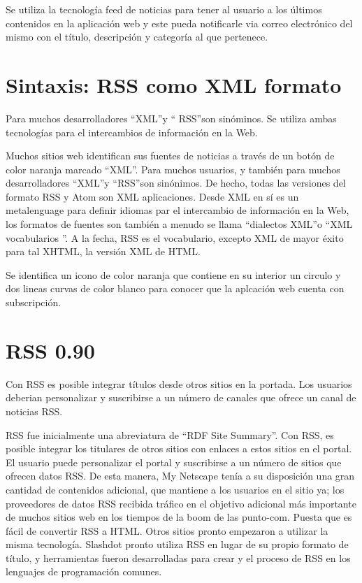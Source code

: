 Se utiliza la tecnolog\'{i}a feed de noticias para tener al usuario a los \'{u}ltimos
contenidos en la aplicaci\'{o}n web y este pueda notificarle via correo electr\'{o}nico
del mismo con el t\'{i}tulo, descripci\'{o}n y categor\'{i}a al que pertenece.

\section{Sintaxis: RSS como XML formato}

Para muchos desarrolladores \textquotedblleft XML\textquotedblright y \textquotedblleft
RSS\textquotedblright son sin\'{o}minos. Se utiliza ambas tecnolog\'{i}as para el 
intercambios de informaci\'{o}n en la Web.

Muchos sitios web identifican sus fuentes de noticias a trav\'{e}s de un bot\'{o}n
de color naranja marcado \textquotedblleft XML\textquotedblright. Para muchos usuarios,
y tambi\'{e}n para muchos desarrolladores \textquotedblleft XML\textquotedblright  y
\textquotedblleft RSS\textquotedblright son sin\'{o}nimos. De hecho, todas las versiones
del formato RSS y Atom son XML aplicaciones. Desde XML en s\'{i} es un metalenguage para
definir idiomas par el intercambio de informaci\'{o}n en la Web, los formatos de fuentes
son tambi\'{e}n a menudo se llama \textquotedblleft dialectos XML\textquotedblright  o 
\textquotedblleft XML vocabularios \textquotedblright. A la fecha, RSS es el vocabulario, 
excepto XML de mayor \'{e}xito para tal XHTML, la versi\'{o}n XML de HTML.\cite{wittenbrink2005rss}

Se identifica un icono de color naranja que contiene en su interior un circulo y dos
lineas curvas de color blanco para conocer que la aplcaci\'{o}n web cuenta con 
subscripci\'{o}n.

\section{RSS 0.90}

Con RSS es posible integrar t\'{i}tulos desde otros sitios en la portada. Los 
usuarios deberian personalizar y suscribirse a un n\'{u}mero de canales que 
ofrece un canal de noticias RSS.

RSS fue inicialmente una abreviatura de \textquotedblleft RDF Site Summary\textquotedblright.
Con RSS, es posible integrar los titulares de otros sitios con enlaces a estos sitios en el 
portal. El usuario puede personalizar el portal y suscribirse a un n\'{u}mero de sitios que
ofrecen datos RSS. De esta manera, My Netscape ten\'{i}a a su disposici\'{o}n una gran 
cantidad de contenidos adicional, que mantiene a los usuarios en el sitio ya; los proveedores
de datos RSS recibida tr\'{a}fico en el objetivo adicional m\'{a}s importante de muchos
sitios web en los tiempos de la boom de las punto-com. Puesta que es f\'{a}cil de convertir
RSS a HTML. Otros sitios pronto empezaron a utilizar la misma tecnolog\'{i}a. Slashdot pronto
utiliza RSS en lugar de su propio formato de t\'{i}tulo, y herramientas fueron desarrolladas
para crear y el proceso de RSS en los lenguajes de programaci\'{o}n comunes.\cite{wittenbrink2005rss}


